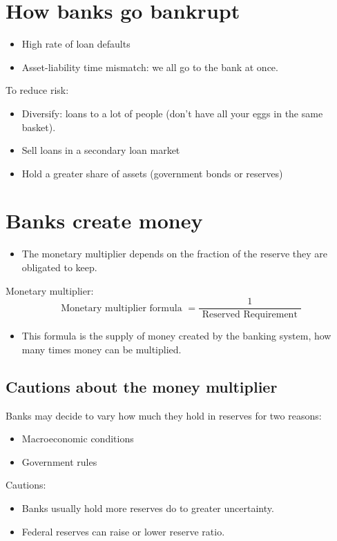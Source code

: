 \documentclass[openany]{book}
\begin{document}
\section{How banks go bankrupt}
\begin{itemize}
    \item High rate of loan defaults 
    \item Asset-liability time mismatch: we all go to the bank at once.
\end{itemize}
To reduce risk: 
\begin{itemize}
    \item Diversify: loans to a lot of people (don't have all your eggs in the same basket).
    \item Sell loans in a secondary loan market 
    \item Hold a greater share of assets (government bonds or reserves)
\end{itemize}

\section{Banks create money}
\begin{itemize}
    \item The monetary multiplier depends on the fraction of the reserve they are obligated to keep.
\end{itemize}
Monetary multiplier: 
\[
  \text{ Monetary multiplier formula } = \frac{1}{\text{ Reserved Requirement }} 
\]
\begin{itemize}
    \item This formula is the supply of money created by the banking system, how many times money can be multiplied.
\end{itemize}

\subsection{Cautions about the money multiplier}
Banks may decide to vary how much they hold in reserves for two reasons: 
\begin{itemize}
    \item Macroeconomic conditions 
    \item Government rules 
\end{itemize}
Cautions:
\begin{itemize}
    \item Banks usually hold more reserves do to greater uncertainty. 
    \item Federal reserves can raise or lower reserve ratio. 
\end{itemize}
\end{document}
